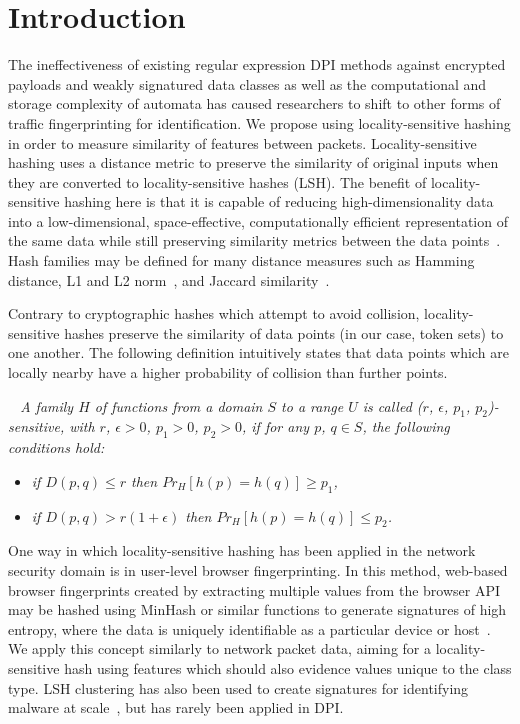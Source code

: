 \section{Introduction}
The ineffectiveness of existing regular expression DPI methods against encrypted payloads and weakly signatured data classes as well as the computational and storage complexity of automata has caused researchers to shift to other forms of traffic fingerprinting for identification. We propose using locality-sensitive hashing in order to measure similarity of features between packets. Locality-sensitive hashing uses a distance metric to preserve the similarity of original inputs when they are converted to locality-sensitive hashes (LSH). The benefit of locality-sensitive hashing here is that it is capable of reducing high-dimensionality data into a low-dimensional, space-effective, computationally efficient representation of the same data while still preserving similarity metrics between the data points~\cite{jafari2021survey}. Hash families may be defined for many distance measures such as Hamming distance, L1 and L2 norm~\cite{ANN-CoD}, and Jaccard similarity~\cite{minhash}.

Contrary to cryptographic hashes which attempt to avoid collision, locality-sensitive hashes preserve the similarity of data points (in our case, token sets) to one another. The following definition intuitively states that data points which are locally nearby have a higher probability of collision than further points.

\medskip

\begin{definition}
\textit{~\cite{lshforest} A family $H$ of functions from a domain $S$ to a range $U$ is called ($r$, $\epsilon$, $p_1$, $p_2$)-sensitive, with $r$, $\epsilon > 0$, $p_1 > 0$, $p_2 > 0$, if for any $p$, $q \in S$, the following conditions hold:}
\begin{itemize}
\item{\textit{if $D(p, q) \leq r$ then $Pr_H[h(p) = h(q)] \geq p_1$,}}
\item{\textit{if $D(p, q) > r(1 + \epsilon)$ then $Pr_H[h(p) = h(q)] \leq p_2$.}}
\end{itemize}
\end{definition}

\medskip


One way in which locality-sensitive hashing has been applied in the network security domain is in user-level browser fingerprinting. In this method, web-based browser fingerprints created by extracting multiple values from the browser API may be hashed using MinHash or similar functions to generate signatures of high entropy, where the data is uniquely identifiable as a particular device or host~\cite{browser}. We apply this concept similarly to network packet data, aiming for a locality-sensitive hash using features which should also evidence values unique to the class type. LSH clustering has also been used to create signatures for identifying malware at scale~\cite{bayer}, but has rarely been applied in DPI.

